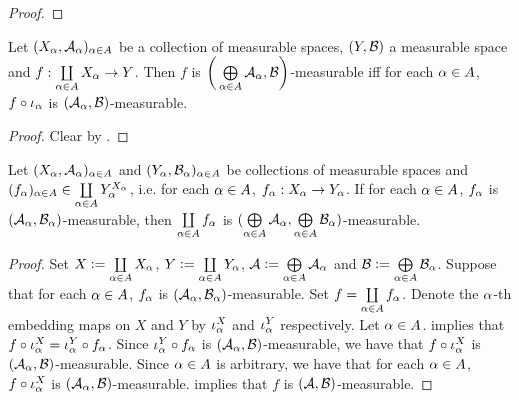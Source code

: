 \documentclass{book}
\begin{document}
	\begin{proof}
	\end{proof}

	\begin{ex} 
		Let $(X_{\alpha}, \mathcal{A}_{\alpha})_{\alpha \in A}$ be a collection of measurable spaces, $(Y, \mathcal{B})$ a measurable space and $f:\coprod\limits_{\alpha \in A} X_{\alpha} \rightarrow Y$. Then $f$ is $\bigg( \bigoplus\limits_{\alpha \in A} \mathcal{A}_{\alpha}, \mathcal{B} \bigg)$-measurable iff for each $\alpha \in A$, $f \circ \iota_{\alpha}$ is $(\mathcal{A}_{\alpha}, \mathcal{B})$-measurable.
	\end{ex}

	\begin{proof}
		Clear by .
	\end{proof}
	
	\begin{ex} 
		Let $(X_{\alpha}, \mathcal{A}_{\alpha})_{\alpha \in A}$ and $(Y_{\alpha}, \mathcal{B}_{\alpha})_{\alpha \in A}$ be collections of measurable spaces and $(f_{\alpha})_{\alpha \in A} \in \coprod\limits_{\alpha \in A} Y_{\alpha}^{X_{\alpha}}$, i.e. for each $\alpha \in A$, $f_{\alpha}:X_{\alpha} \rightarrow Y_{\alpha}$. If for each $\alpha \in A$, $f_{\alpha}$ is $(\mathcal{A}_{\alpha}, \mathcal{B}_{\alpha})$-measurable, then $\coprod\limits_{\alpha \in A} f_{\alpha}$ is $(\bigoplus\limits_{\alpha \in A} \mathcal{A}_{\alpha}, \bigoplus\limits_{\alpha \in A} \mathcal{B}_{\alpha})$-measurable.
	\end{ex}
	
	\begin{proof} 
		Set $X \vcentcolon= \coprod\limits_{\alpha \in A} X_{\alpha}$, $Y \vcentcolon= \coprod\limits_{\alpha \in A}Y_{\alpha}$, $\mathcal{A} \vcentcolon= \bigoplus\limits_{\alpha \in A} \mathcal{A}_{\alpha}$ and $\mathcal{B} \vcentcolon= \bigoplus\limits_{\alpha \in A} \mathcal{B}_{\alpha}$. Suppose that for each $\alpha \in A$, $f_{\alpha}$ is $(\mathcal{A}_{\alpha}, \mathcal{B}_{\alpha})$-measurable. Set $f = \coprod\limits_{\alpha \in A} f_{\alpha}$. Denote the $\alpha$-th embedding maps on $X$ and $Y$ by $\iota^X_{\alpha}$ and $\iota^Y_{\alpha}$ respectively. Let $\alpha \in A$.  implies that $f \circ \iota^X_{\alpha} = \iota^Y_{\alpha} \circ f_{\alpha}$. Since $\iota^Y_{\alpha} \circ f_{\alpha}$ is $(\mathcal{A}_{\alpha}, \mathcal{B})$-measurable, we have that $f \circ \iota^X_{\alpha}$ is $(\mathcal{A}_{\alpha}, \mathcal{B})$-measurable. Since $\alpha \in A$ is arbitrary, we have that for each $\alpha \in A$, $f \circ \iota^X_{\alpha}$ is $(\mathcal{A}_{\alpha}, \mathcal{B})$-measurable.  implies that $f$ is $(\mathcal{A}, \mathcal{B})$-measurable.
	\end{proof}
	
\end{document}
